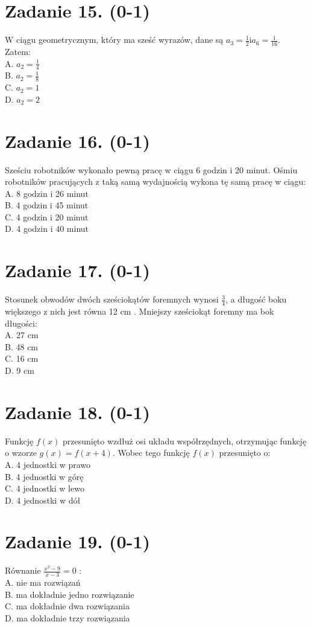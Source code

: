 \documentclass[10pt]{article}
\begin{document}
\section*{Zadanie 15. (0-1)}
W ciągu geometrycznym, który ma sześć wyrazów, dane są \(a_{3}=\frac{1}{2} \mathrm{i} a_{6}=\frac{1}{16}\). Zatem:\\
A. \(a_{2}=\frac{1}{4}\)\\
B. \(a_{2}=\frac{1}{8}\)\\
C. \(a_{2}=1\)\\
D. \(a_{2}=2\)

\section*{Zadanie 16. (0-1)}
Sześciu robotników wykonało pewną pracę w ciągu 6 godzin i 20 minut. Ośmiu robotników pracujących z taką samą wydajnością wykona tę samą pracę w ciągu:\\
A. 8 godzin i 26 minut\\
B. 4 godzin i 45 minut\\
C. 4 godzin i 20 minut\\
D. 4 godzin i 40 minut

\section*{Zadanie 17. (0-1)}
Stosunek obwodów dwóch sześciokątów foremnych wynosi \(\frac{3}{4}\), a długość boku większego z nich jest równa 12 cm . Mniejszy sześciokąt foremny ma bok długości:\\
A. 27 cm\\
B. 48 cm\\
C. 16 cm\\
D. 9 cm

\section*{Zadanie 18. (0-1)}
Funkcję \(f(x)\) przesunięto wzdłuż osi układu współrzędnych, otrzymując funkcję o wzorze \(g(x)=f(x+4)\). Wobec tego funkcję \(f(x)\) przesunięto o:\\
A. 4 jednostki w prawo\\
B. 4 jednostki w górę\\
C. 4 jednostki w lewo\\
D. 4 jednostki w dół

\section*{Zadanie 19. (0-1)}
Równanie \(\frac{x^{2}-9}{x-3}=0\) :\\
A. nie ma rozwiązań\\
B. ma dokładnie jedno rozwiązanie\\
C. ma dokładnie dwa rozwiązania\\
D. ma dokładnie trzy rozwiązania
\end{document}
